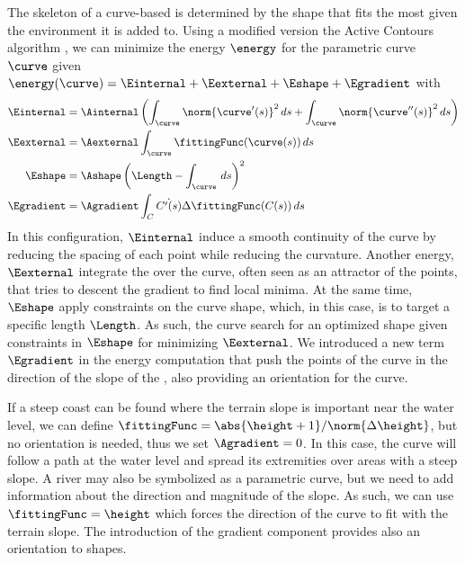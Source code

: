 

The skeleton of a curve-based  is determined by the shape that fits the most given the environment it is added to. 
Using a modified version the Active Contours algorithm \cite{Kass1988}, we can minimize the energy $\energy$ for the parametric curve $\curve$ given $\energy(\curve) = \Einternal + \Eexternal + \Eshape + \Egradient$ with  
\begin{align}
    \label{eq:internal-energy-equation}
    \Einternal &= \Ainternal \left( \int_{\curve}{ \norm{\curve'(s)}^2 \, ds} + \int_{\curve}{ \norm{\curve''(s)}^2 \, ds}  \right) \\
    \Eexternal &= \Aexternal \int_{\curve}{ \fittingFunc(\curve(s)) \, ds } \\
    \Eshape    &= \Ashape \left( \Length - \int_{\curve}{ \, ds } \right)^2 \\
    \Egradient &= \Agradient \int_{C}{ \dot{C'(s)}{\Delta \fittingFunc(C(s))} \, ds }
\end{align}
In this configuration, $\Einternal$ induce a smooth continuity of the curve by reducing the spacing of each point while reducing the curvature. Another energy, $\Eexternal$ integrate the  over the curve, often seen as an attractor of the points, that tries to descent the gradient to find local minima. At the same time, $\Eshape$ apply constraints on the curve shape, which, in this case, is to target a specific length $\Length$. As such, the curve search for an optimized shape given constraints in $\Eshape$ for minimizing $\Eexternal$. We introduced a new term $\Egradient$ in the energy computation that push the points of the curve in the direction of the slope of the , also providing an orientation for the curve.

If a steep coast can be found where the terrain slope is important near the water level, we can define $\fittingFunc = \abs{\height + 1} / \norm{\Delta \height}$, but no orientation is needed, thus we set $\Agradient = 0$. In this case, the curve will follow a path at the water level and spread its extremities over areas with a steep slope. A river may also be symbolized as a parametric curve, but we need to add information about the direction and magnitude of the slope.  As such, we can use $\fittingFunc = \height$ which forces the direction of the curve to fit with the terrain slope. The introduction of the gradient component provides also an orientation to shapes.

